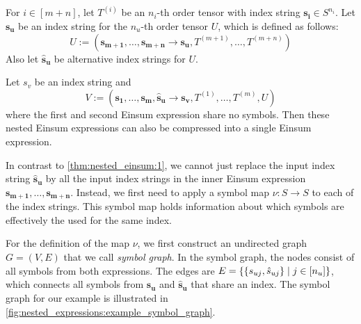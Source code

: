 \begin{theorem}
    \label{thm:nested_einsum:4}
    For $i \in [m + n]$, let $T^{(i)}$ be an $n_i$-th order tensor with index string $\bm{s_i} \in S^{n_i}$.
    Let $\bm{s_u}$ be an index string for the $n_u$-th order tensor $U$, which is defined as follows:
    $$U := (\bm{s_{m + 1}},\dots,\bm{s_{m + n}} \rightarrow \bm{s_u}, T^{(m + 1)},\dots,T^{(m + n)})$$
    Also let $\bm{\hat{s}_u}$ be alternative index strings for $U$.

    Let $s_v$ be an index string and
    $$V := (\bm{s_1},\dots,\bm{s_m}, \bm{\hat{s}_u} \rightarrow \bm{s_v}, T^{(1)},\dots,T^{(m)}, U)$$
    where the first and second Einsum expression share no symbols.
    Then these nested Einsum expressions can also be compressed into a single Einsum expression.

    In contrast to \autoref{thm:nested_einsum:1}, we cannot just replace the input index string $\bm{\hat{s}_u}$ by all the input index strings in the inner Einsum expression $\bm{s_{m + 1}},\dots,\bm{s_{m + n}}$.
    Instead, we first need to apply a symbol map $\nu: S \rightarrow S$ to each of the index strings.
    This symbol map holds information about which symbols are effectively the used for the same index.

    For the definition of the map $\nu$, we first construct an undirected graph $G = (V, E)$ that we call \textit{symbol graph}.
    In the symbol graph, the nodes consist of all symbols from both expressions.
    The edges are $E = \lbrace \lbrace s_{uj}, \hat{s}_{uj} \rbrace \mid j \in [n_u] \rbrace$,
    which connects all symbols from $\bm{s_u}$ and $\bm{\hat{s}_u}$ that share an index.
    The symbol graph for our example is illustrated in \autoref{fig:nested_expressions:example_symbol_graph}.

    \begin{figure}[h]
        \centering
\end{figure}
\end{theorem}
